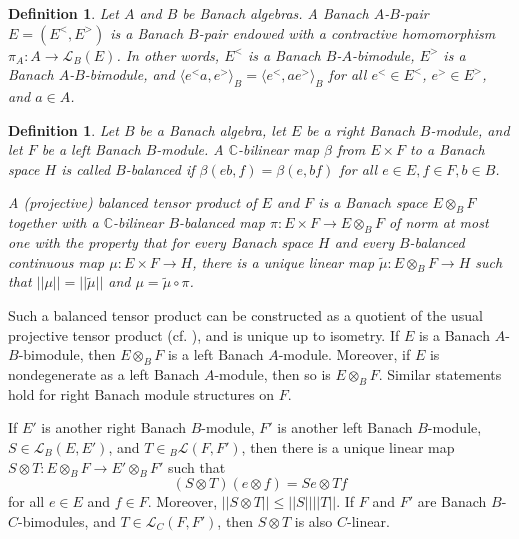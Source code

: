 \documentclass[a4,11pt]{amsart}
\newtheorem{defn}[thm]{Definition}
\theoremstyle{remark}
\newtheorem{rem}[thm]{Remark}
\begin{document}
\begin{defn}
Let $A$ and $B$ be Banach algebras. A Banach $A$-$B$-pair $E=(E^<,E^>)$ is a Banach $B$-pair endowed with a contractive homomorphism $\pi_A:A\rightarrow\mathcal{L}_B(E)$. In other words, $E^<$ is a Banach $B$-$A$-bimodule, $E^>$ is a Banach $A$-$B$-bimodule, and $\langle e^<a,e^> \rangle_B=\langle e^<,ae^> \rangle_B$ for all $e^<\in E^<$, $e^>\in E^>$, and $a\in A$.
\end{defn}




\begin{defn}
Let $B$ be a Banach algebra, let $E$ be a right Banach $B$-module, and let $F$ be a left Banach $B$-module. A $\mathbb{C}$-bilinear map $\beta$ from $E\times F$ to a Banach space $H$ is called $B$-balanced if $\beta(eb,f)=\beta(e,bf)$ for all $e\in E,f\in F,b\in B$.

A (projective) balanced tensor product of $E$ and $F$ is a Banach space $E\otimes_BF$ together with a $\mathbb{C}$-bilinear $B$-balanced map $\pi:E\times F\rightarrow E\otimes_BF$ of norm at most one with the property that for every Banach space $H$ and every $B$-balanced continuous map $\mu:E\times F\rightarrow H$, there is a unique linear map $\tilde{\mu}:E\otimes_BF\rightarrow H$ such that $||\mu||=||\tilde{\mu}||$ and $\mu=\tilde{\mu}\circ\pi$.
\end{defn}



Such a balanced tensor product can be constructed as a quotient of the usual projective tensor product (cf. \cite[p.11]{Laf02}), and is unique up to isometry.
If $E$ is a Banach $A$-$B$-bimodule, then $E\otimes_BF$ is a left Banach $A$-module. Moreover, if $E$ is nondegenerate as a left Banach $A$-module, then so is $E\otimes_BF$. Similar statements hold for right Banach module structures on $F$.

If $E'$ is another right Banach $B$-module, $F'$ is another left Banach $B$-module, $S\in\mathcal{L}_B(E,E')$, and $T\in {}_B\mathcal{L}(F,F')$, then there is a unique linear map $S\otimes T:E\otimes_B F\rightarrow E'\otimes_B F'$ such that 
\[(S\otimes T)(e\otimes f)=Se\otimes Tf\] for all $e\in E$ and $f\in F$. Moreover, $||S\otimes T||\leq ||S||||T||$.
If $F$ and $F'$ are Banach $B$-$C$-bimodules, and $T\in\mathcal{L}_C(F,F')$, then $S\otimes T$ is also $C$-linear.
\end{document}
